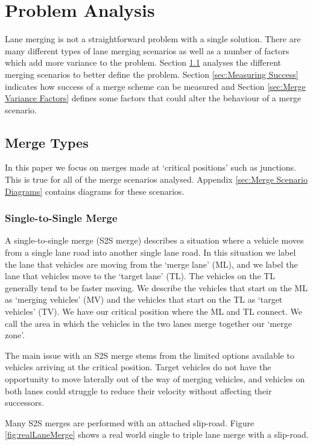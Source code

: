 \chapter{Problem Analysis}
\label{cha:Problem Analysis}
Lane merging is not a straightforward problem with a single solution. There are many different types of lane merging scenarios as well as a number of factors which add more variance to the problem. Section \ref{sec:Merge Types} analyses the different merging scenarios to better define the problem. Section \ref{sec:Measuring Success} indicates how success of a merge scheme can be measured and Section \ref{sec:Merge Variance Factors} defines some factors that could alter the behaviour of a merge scenario.

\section{Merge Types}
\label{sec:Merge Types}
In this paper we focus on merges made at `critical positions' such as junctions. This is true for all of the merge scenarios analysed. Appendix \ref{sec:Merge Scenario Diagrams} contains diagrams for these scenarios.

\subsection{Single-to-Single Merge}
\label{subsec:Single-to-Single Merge}
A single-to-single merge (S2S merge) describes a situation where a vehicle moves from a single lane road into another single lane road. In this situation we label the lane that vehicles are moving from the `merge lane' (ML), and we label the lane that vehicles move to the `target lane' (TL). The vehicles on the TL generally tend to be faster moving. We describe the vehicles that start on the ML as `merging vehicles' (MV) and the vehicles that start on the TL as `target vehicles' (TV). We have our critical position where the ML and TL connect. We call the area in which the vehicles in the two lanes merge together our `merge zone'.

The main issue with an S2S merge stems from the limited options available to vehicles arriving at the critical position. Target vehicles do not have the opportunity to move laterally out of the way of merging vehicles, and vehicles on both lanes could struggle to reduce their velocity without affecting their successors.

Many S2S merges are performed with an attached slip-road. Figure \ref{fig:realLaneMerge} shows a real world single to triple lane merge with a slip-road.

